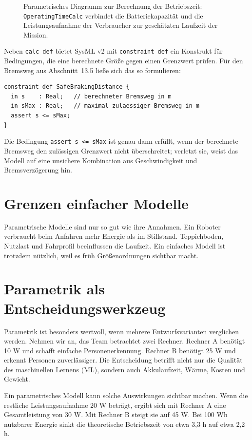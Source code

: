 \begin{figure}[H]
  \centering
  \caption{Parametrisches Diagramm zur Berechnung der Betriebszeit: \texttt{OperatingTimeCalc} verbindet die Batteriekapazität und die Leistungsaufnahme der Verbraucher zur geschätzten Laufzeit der Mission.}
  \label{fig:kap13-parametrisch-betriebszeit}
\end{figure}

Neben \texttt{calc def} bietet SysML v2 mit \texttt{constraint def} ein Konstrukt für Bedingungen, die eine berechnete Größe gegen einen Grenzwert prüfen. Für den Bremsweg aus Abschnitt~13.5 ließe sich das so formulieren:

\begin{lstlisting}
constraint def SafeBrakingDistance {
  in s    : Real;   // berechneter Bremsweg in m
  in sMax : Real;   // maximal zulaessiger Bremsweg in m
  assert s <= sMax;
}
\end{lstlisting}

Die Bedingung \texttt{assert s <= sMax} ist genau dann erfüllt, wenn der berechnete Bremsweg den zulässigen Grenzwert nicht überschreitet; verletzt sie, weist das Modell auf eine unsichere Kombination aus Geschwindigkeit und Bremsverzögerung hin.

\section{Grenzen einfacher Modelle}
Parametrische Modelle sind nur so gut wie ihre Annahmen. Ein Roboter verbraucht beim Anfahren mehr Energie als im Stillstand. Teppichboden, Nutzlast und Fahrprofil beeinflussen die Laufzeit. Ein einfaches Modell ist trotzdem nützlich, weil es früh Größenordnungen sichtbar macht.

\section{Parametrik als Entscheidungswerkzeug}
Parametrik ist besonders wertvoll, wenn mehrere Entwurfsvarianten verglichen werden. Nehmen wir an, das Team betrachtet zwei Rechner. Rechner A benötigt 10 W und schafft einfache Personenerkennung. Rechner B benötigt 25 W und erkennt Personen zuverlässiger. Die Entscheidung betrifft nicht nur die Qualität des maschinellen Lernens (ML), sondern auch Akkulaufzeit, Wärme, Kosten und Gewicht.

Ein parametrisches Modell kann solche Auswirkungen sichtbar machen. Wenn die restliche Leistungsaufnahme 20 W beträgt, ergibt sich mit Rechner A eine Gesamtleistung von 30 W. Mit Rechner B steigt sie auf 45 W. Bei 100 Wh nutzbarer Energie sinkt die theoretische Betriebszeit von etwa 3,3 h auf etwa 2,2 h.

